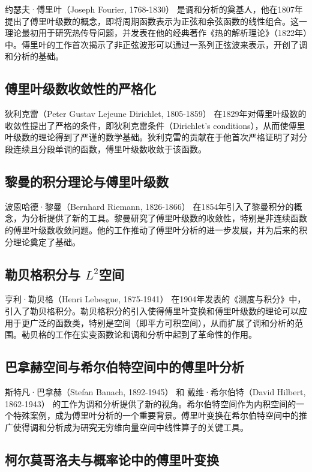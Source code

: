 \documentclass{article}
\begin{document}
约瑟夫·傅里叶（Joseph Fourier, 1768-1830） 是调和分析的奠基人，他在1807年提出了傅里叶级数的概念，即将周期函数表示为正弦和余弦函数的线性组合。这一理论最初用于研究热传导问题，并发表在他的经典著作《热的解析理论》（1822年）中。傅里叶的工作首次揭示了非正弦波形可以通过一系列正弦波来表示，开创了调和分析的基础。

\subsection{傅里叶级数收敛性的严格化}

狄利克雷（Peter Gustav Lejeune Dirichlet, 1805-1859） 在1829年对傅里叶级数的收敛性提出了严格的条件，即狄利克雷条件（Dirichlet's conditions），从而使傅里叶级数的理论得到了严谨的数学基础。狄利克雷的贡献在于他首次严格证明了对分段连续且分段单调的函数，傅里叶级数收敛于该函数。

\subsection{黎曼的积分理论与傅里叶级数}

波恩哈德·黎曼（Bernhard Riemann, 1826-1866） 在1854年引入了黎曼积分的概念，为分析提供了新的工具。黎曼研究了傅里叶级数的收敛性，特别是非连续函数的傅里叶级数收敛问题。他的工作推动了傅里叶分析的进一步发展，并为后来的积分理论奠定了基础。


\subsection{勒贝格积分与 \( L^2 \)空间}

亨利·勒贝格（Henri Lebesgue, 1875-1941） 在1904年发表的《测度与积分》中，引入了勒贝格积分。勒贝格积分的引入使得傅里叶变换和傅里叶级数的理论可以应用于更广泛的函数类，特别是空间（即平方可积空间），从而扩展了调和分析的范围。勒贝格的工作在实变函数论和调和分析中起到了革命性的作用。


\subsection{巴拿赫空间与希尔伯特空间中的傅里叶分析}

斯特凡·巴拿赫（Stefan Banach, 1892-1945） 和 戴维·希尔伯特（David Hilbert, 1862-1943） 的工作为调和分析提供了新的视角。希尔伯特空间作为内积空间的一个特殊案例，成为傅里叶分析的一个重要背景。傅里叶变换在希尔伯特空间中的推广使得调和分析成为研究无穷维向量空间中线性算子的关键工具。


\subsection{柯尔莫哥洛夫与概率论中的傅里叶变换}
\end{document}
